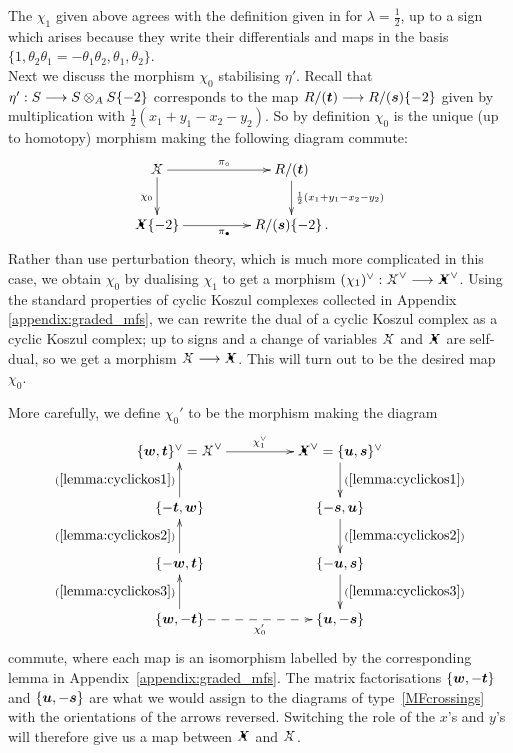 \documentclass{compositio}
\theoremstyle{definition}
\numberwithin{equation}{section}
\begin{document}
The $\chi_1$ given above agrees with the definition given in \cite[p.51]{kr0401268} for $\lambda = \frac{1}{2}$, up to a sign which arises because they write their differentials and maps in the basis $\{1, \theta_2 \theta_1 = - \theta_1 \theta_2, \theta_1, \theta_2\}$.
\\

Next we discuss the morphism $\chi_0$ stabilising $\eta'$. Recall that $\eta': S \longrightarrow S \otimes_A S\{-2\}$ corresponds to the map $R/(\boldsymbol{t}) \longrightarrow R/(\boldsymbol{s})\{-2\}$ given by multiplication with $\frac{1}{2}(x_1 + y_1 - x_2 - y_2)$. So by definition $\chi_0$ is the unique (up to homotopy) morphism making the following diagram commute:
\begin{equation}\label{eq:cons50}
\xymatrix@C+2pc{
\Xcirc \ar[d]_{\chi_0} \ar[r]^{\pi_{\circ}} & R/(\boldsymbol{t}) \ar[d]^-{\frac{1}{2}(x_1+y_1-x_2-y_2)}\\
\Xbul\{-2\} \ar[r]_{\pi_{\bullet}} & R/(\boldsymbol{s})\{-2\} \, .
}
\end{equation}
Rather than use perturbation theory, which is much more complicated in this case, we obtain $\chi_0$ by dualising $\chi_1$ to get a morphism $(\chi_1)\mdual: \Xcirc\mdual \lto \Xbul\mdual$. Using the standard properties of cyclic Koszul complexes collected in Appendix \ref{appendix:graded_mfs}, we can rewrite the dual of a cyclic Koszul complex as a cyclic Koszul complex; up to signs and a change of variables $\Xcirc$ and $\Xbul$ are self-dual, so we get a morphism $\Xcirc \lto \Xbul$. This will turn out to be the desired map $\chi_0$.

More carefully, we define $\chi_0'$ to be the morphism making the diagram
\[
\xymatrix@C+2pc{
\{ \bs{w}, \bs{t} \}\mdual = \Xcirc\mdual \ar[r]^-{\chi_1\mdual} & \Xbul\mdual = \{ \bs{u}, \bs{s} \}\mdual \ar[d]^-{(\ref{lemma:cyclickos1})}\\
\{ -\bs{t}, \bs{w} \} \ar[u]^-{(\ref{lemma:cyclickos1})} & \{ -\bs{s}, \bs{u} \} \ar[d]^-{(\ref{lemma:cyclickos2})}\\
\{ -\bs{w}, \bs{t} \} \ar[u]^-{(\ref{lemma:cyclickos2})} & \{ -\bs{u}, \bs{s} \} \ar[d]^-{(\ref{lemma:cyclickos3})}\\
\{ \bs{w}, -\bs{t} \} \ar@{-->}[r]_-{\chi_0'} \ar[u]^-{(\ref{lemma:cyclickos3})} & \{ \bs{u}, -\bs{s} \}
}
\]
commute, where each map is an isomorphism labelled by the corresponding lemma in Appendix~\ref{appendix:graded_mfs}. The matrix factorisations $\{ \boldsymbol{w}, -\boldsymbol{t} \}$ and $\{ \boldsymbol{u}, -\boldsymbol{s} \}$ are what we would assign to the diagrams of type~\eqref{MFcrossings} with the orientations of the arrows reversed. Switching the role of the $x$'s and $y$'s will therefore give us a map between $\Xbul$ and $\Xcirc$.
\end{document}
